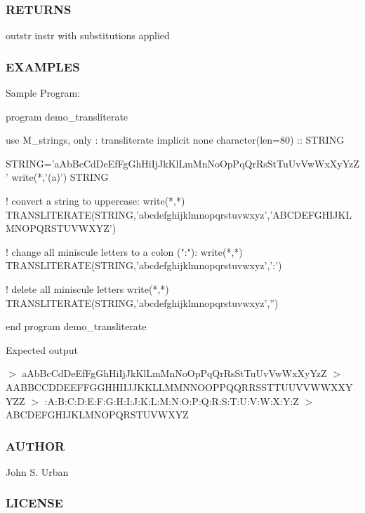  \subsubsection*{R\+E\+T\+U\+R\+NS}

outstr instr with substitutions applied

\subsubsection*{E\+X\+A\+M\+P\+L\+ES}

Sample Program\+: \begin{DoxyVerb}program demo_transliterate

use M_strings, only : transliterate
implicit none
character(len=80)   :: STRING

 STRING='aAbBcCdDeEfFgGhHiIjJkKlLmMnNoOpPqQrRsStTuUvVwWxXyYzZ'
 write(*,'(a)') STRING

 ! convert a string to uppercase:
 write(*,*) TRANSLITERATE(STRING,'abcdefghijklmnopqrstuvwxyz','ABCDEFGHIJKLMNOPQRSTUVWXYZ')

 ! change all miniscule letters to a colon (":"):
 write(*,*) TRANSLITERATE(STRING,'abcdefghijklmnopqrstuvwxyz',':')

 ! delete all miniscule letters
 write(*,*) TRANSLITERATE(STRING,'abcdefghijklmnopqrstuvwxyz','')

end program demo_transliterate
\end{DoxyVerb}


Expected output

$>$ a\+Ab\+Bc\+Cd\+De\+Ef\+Fg\+Gh\+Hi\+Ij\+Jk\+Kl\+Lm\+Mn\+No\+Op\+Pq\+Qr\+Rs\+St\+Tu\+Uv\+Vw\+Wx\+Xy\+YzZ $>$ A\+A\+B\+B\+C\+C\+D\+D\+E\+E\+F\+F\+G\+G\+H\+H\+I\+I\+J\+J\+K\+K\+L\+L\+M\+M\+N\+N\+O\+O\+P\+P\+Q\+Q\+R\+R\+S\+S\+T\+T\+U\+U\+V\+V\+W\+W\+X\+X\+Y\+Y\+ZZ $>$ \+:A\+:\+B\+:\+C\+:\+D\+:\+E\+:\+F\+:\+G\+:\+H\+:\+I\+:\+J\+:\+K\+:\+L\+:\+M\+:\+N\+:\+O\+:\+P\+:\+Q\+:\+R\+:\+S\+:\+T\+:\+U\+:\+V\+:\+W\+:\+X\+:Y\+:Z $>$ A\+B\+C\+D\+E\+F\+G\+H\+I\+J\+K\+L\+M\+N\+O\+P\+Q\+R\+S\+T\+U\+V\+W\+X\+YZ

\subsubsection*{A\+U\+T\+H\+OR}

John S. Urban \subsubsection*{L\+I\+C\+E\+N\+SE}

